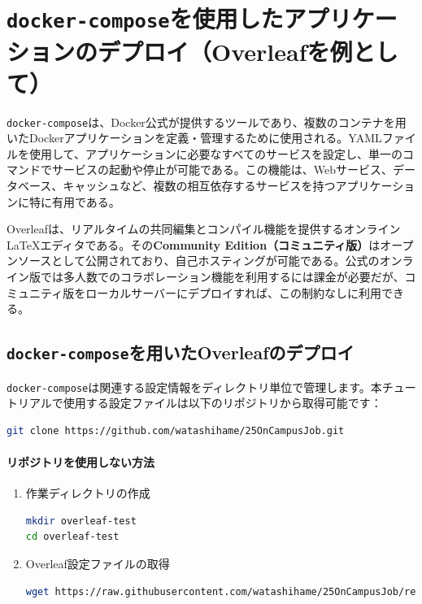 \section{\texttt{docker-compose}を使用したアプリケーションのデプロイ（Overleafを例として）}

\texttt{docker-compose}は、Docker公式が提供するツールであり、複数のコンテナを用いたDockerアプリケーションを定義・管理するために使用される。YAMLファイルを使用して、アプリケーションに必要なすべてのサービスを設定し、単一のコマンドでサービスの起動や停止が可能である。この機能は、Webサービス、データベース、キャッシュなど、複数の相互依存するサービスを持つアプリケーションに特に有用である。

Overleafは、リアルタイムの共同編集とコンパイル機能を提供するオンラインLaTeXエディタである。その\textbf{Community Edition（コミュニティ版）}はオープンソースとして公開されており、自己ホスティングが可能である。公式のオンライン版では多人数でのコラボレーション機能を利用するには課金が必要だが、コミュニティ版をローカルサーバーにデプロイすれば、この制約なしに利用できる。

\subsection{\texttt{docker-compose}を用いたOverleafのデプロイ}
\texttt{docker-compose}は関連する設定情報をディレクトリ単位で管理します。本チュートリアルで使用する設定ファイルは以下のリポジトリから取得可能です：

\begin{lstlisting}[language=bash]
git clone https://github.com/watashihame/25OnCampusJob.git
\end{lstlisting}

\paragraph{リポジトリを使用しない方法}
\begin{enumerate}
\item 作業ディレクトリの作成
\begin{lstlisting}[language=bash]
mkdir overleaf-test
cd overleaf-test
\end{lstlisting}

\item Overleaf設定ファイルの取得
\begin{lstlisting}[language=bash]
wget https://raw.githubusercontent.com/watashihame/25OnCampusJob/refs/heads/main/overleaf-test/docker-compose.yml
\end{lstlisting}
\end{enumerate}


